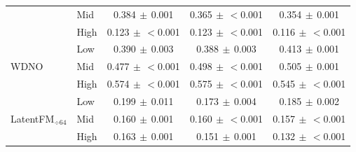 \begin{table}[ht]
{\begin{tabular}{llccc}
 & Mid & 0.384{\scriptsize$\,\pm\,$0.001} & 0.365{\scriptsize$\,\pm\,$$<$0.001} & 0.354{\scriptsize$\,\pm\,$0.001} \\
 & High & 0.123{\scriptsize$\,\pm\,$$<$0.001} & 0.123{\scriptsize$\,\pm\,$$<$0.001} & 0.116{\scriptsize$\,\pm\,$$<$0.001} \\
\midrule
\multirow{3}{*}{WDNO} & Low & 0.390{\scriptsize$\,\pm\,$0.003} & 0.388{\scriptsize$\,\pm\,$0.003} & 0.413{\scriptsize$\,\pm\,$0.001} \\
 & Mid & 0.477{\scriptsize$\,\pm\,$$<$0.001} & 0.498{\scriptsize$\,\pm\,$$<$0.001} & 0.505{\scriptsize$\,\pm\,$0.001} \\
 & High & 0.574{\scriptsize$\,\pm\,$$<$0.001} & 0.575{\scriptsize$\,\pm\,$$<$0.001} & 0.545{\scriptsize$\,\pm\,$$<$0.001} \\
\midrule
\multirow{3}{*}{LatentFM$_{\div 64}$} & Low & 0.199{\scriptsize$\,\pm\,$0.011} & 0.173{\scriptsize$\,\pm\,$0.004} & 0.185{\scriptsize$\,\pm\,$0.002} \\
 & Mid & 0.160{\scriptsize$\,\pm\,$0.001} & 0.160{\scriptsize$\,\pm\,$$<$0.001} & 0.157{\scriptsize$\,\pm\,$$<$0.001} \\
 & High & 0.163{\scriptsize$\,\pm\,$0.001} & 0.151{\scriptsize$\,\pm\,$0.001} & 0.132{\scriptsize$\,\pm\,$$<$0.001} \\
\bottomrule
\end{tabular}
}
\end{table}
